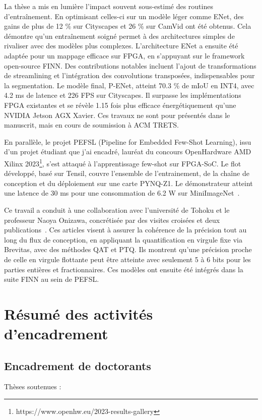 \documentclass[11pt]{report}
\begin{document}
La thèse a mis en lumière l'impact souvent sous-estimé des routines d'entraînement. En optimisant celles-ci sur un modèle léger comme ENet, des gains de plus de 12 \% sur Cityscapes et 26 \% sur CamVid ont été obtenus. Cela démontre qu'un entraînement soigné permet à des architectures simples de rivaliser avec des modèles plus complexes.
L'architecture ENet a ensuite été adaptée pour un mappage efficace sur FPGA, en s'appuyant sur le framework open-source FINN. Des contributions notables incluent l'ajout de transformations de streamlining et l'intégration des convolutions transposées, indispensables pour la segmentation. Le modèle final, P-ENet, atteint 70.3 \% de mIoU en INT4, avec 4.2 ms de latence et 226 FPS sur Cityscapes. Il surpasse les implémentations FPGA existantes et se révèle 1.15 fois plus efficace énergétiquement qu'une NVIDIA Jetson AGX Xavier. Ces travaux ne sont pour présentés dans le manuscrit, mais en cours de soumission à ACM TRETS.

En parallèle, le projet PEFSL (Pipeline for Embedded Few-Shot Learning), issu d'un projet étudiant que j'ai encadré, lauréat du concours OpenHardware AMD Xilinx 2023\footnote{https://www.openhw.eu/2023-results-gallery}, s'est attaqué à l'apprentissage few-shot sur FPGA-SoC. Le flot développé, basé sur Tensil, couvre l'ensemble de l'entrainement, de la chaîne de conception et du déploiement sur une carte PYNQ-Z1. Le démonstrateur atteint une latence de 30 ms pour une consommation de 6.2 W sur MiniImageNet~\cite{grativol:hal-04559365}.

Ce travail a conduit à une collaboration avec l'université de Tohoku et le professeur Naoya Onizawa, concrétisée par des visites croisées et deux publications~\cite{kanda:hal-04984380,kanda:hal-04984381}. Ces articles visent à assurer la cohérence de la précision tout au long du flux de conception, en appliquant la quantification en virgule fixe via Brevitas, avec des méthodes QAT et PTQ. Ils montrent qu'une précision proche de celle en virgule flottante peut être atteinte avec seulement 5 à 6 bits pour les parties entières et fractionnaires. Ces modèles ont ensuite été intégrés dans la suite FINN au sein de PEFSL.
\section{Résumé des activités d'encadrement}
\label{sec:encadrement}

\subsection{Encadrement de doctorants}
Thèses soutenues :
\end{document}
